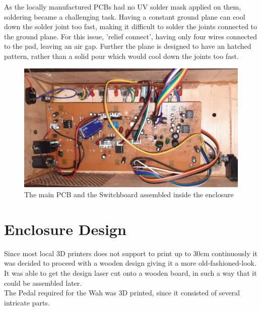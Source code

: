 \documentclass{article}
\begin{document}
            As the locally manufactured PCBs had no UV solder mask applied on them, soldering became a challenging task. Having a constant ground plane can cool down the solder joint too fast, making it difficult to solder the joints connected to the ground plane. For this issue, 'relief connect', having only four wires connected to the pad, leaving an air gap. Further the plane is designed to have an hatched pattern, rather than a solid pour which would cool down the joints too fast. 

             \begin{figure}[h!]
                    \centering
                    \includegraphics[scale=0.3, origin=c]{4.jpg}
                    \caption{The main PCB and the Switchboard assembled inside the enclosure}
                    \label{fig:enter-label}
                \end{figure}

	\section{Enclosure Design}
            Since most local 3D printers does not support to print up to 30cm continuously it was decided to proceed with a wooden design giving it a more old-fashioned-look. It was able to get the design laser cut onto a wooden board,  in such a way that it could be assembled later.\\

            The Pedal required for the Wah was 3D printed, since it consisted of several intricate parts.
\end{document}
